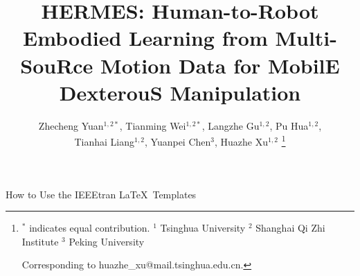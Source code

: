 \documentclass[lettersize,journal]{IEEEtran}
\begin{document}
\title{HERMES: \textbf{H}uman-to-Robot \textbf{E}mbodied Learning from Multi-Sou\textbf{R}ce \textbf{M}otion Data for Mobil\textbf{E} Dexterou\textbf{S} Manipulation}
\author{Zhecheng Yuan$^{1,2*}$, Tianming Wei$^{1,2*}$, Langzhe Gu$^{1,2}$, Pu Hua$^{1,2}$,\\ Tianhai Liang$^{1,2}$,  Yuanpei Chen$^{3}$, Huazhe Xu$^{1,2}$
\thanks{$^{*}$ indicates equal contribution. $^{1}$ Tsinghua University $^{2}$ Shanghai Qi Zhi Institute $^{3}$ Peking University 

Corresponding to huazhe\_xu@mail.tsinghua.edu.cn.
}



}

\markboth{}%
{How to Use the IEEEtran \LaTeX \ Templates}

\maketitle
{}
\newtheorem{theo}{Theorem}
\newtheorem{definition}{Definition}
\newtheorem{assumption}{Assumption}
\newtheorem{lemma}{Lemma}
\newcommand{\dd}[2]{$#1\scriptstyle{\pm#2}$}
\newcommand{\singledd}[1]{$#1$}
\newcommand{\singleddbf}[1]
{\cellcolor{lyyblue}$\mathbf{#1}$}

\newcommand{\ddbf}[2]
{\cellcolor{lyyred}$\mathbf{#1\scriptstyle{\pm#2}}$}
\newcommand{\blueddbf}[2]{%
  \cellcolor{lyyblue}%
  {\textcolor{lyydeepred}{$\mathbf{#1{\scriptstyle\,\pm\,}#2}$}}%
}



\newcommand{\ddbfblue}[2]{\cellcolor{tablecolor2}$\mathbf{#1\scriptstyle{\pm#2}}$}
\newcommand{\cc}[1]{$#1$}
\newcommand{\ccbf}[1]{\cellcolor{lyyred}$\mathbf{#1}$}
\newcommand{\best}[1]{\textcolor{lyydeepred}{\singleddbf{#1}}}
\newcommand{\ourshort}{HERMES\xspace}



\end{document}
